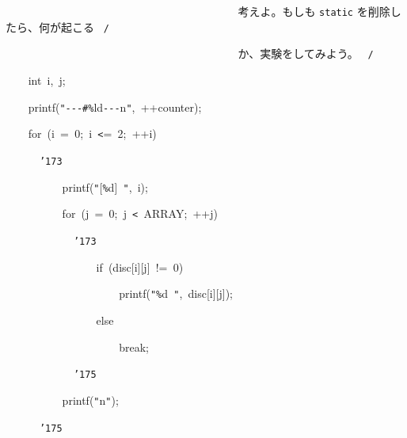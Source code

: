 \documentclass{article}
\begin{document}
\noindent
\mbox{}{\tt\mc \ \ \ \ \ \ \ \ }{\tt\mc \ \ \ \ \ \ \ \ }{\tt\mc \ \ \ \ \ \ \ \ }{\tt\mc \ \ \ \ \ \ \ \ }{\tt\mc \ \ \ \ \ \ \ \ }\rm\mc {\tt /}{\tt *}\  {}考えよ。もしも {\tt static}
					   を削除したら、何が起こる \hfill \rm\mc \ {\tt *}{\tt /}
\tt\mc 

\noindent
\mbox{}{\tt\mc \ \ \ \ \ \ \ \ }{\tt\mc \ \ \ \ \ \ \ \ }{\tt\mc \ \ \ \ \ \ \ \ }{\tt\mc \ \ \ \ \ \ \ \ }{\tt\mc \ \ \ \ \ \ \ \ }\rm\mc {\tt /}{\tt *}\  {}か、実験をしてみよう。
					   \hfill \rm\mc \ {\tt *}{\tt /}
\tt\mc 

\noindent
\mbox{}{\tt\mc \ \ \ \ }int{\tt\mc \ }i,{\tt\mc \ }j;

\noindent
\mbox{}\hfill

\noindent
\mbox{}{\tt\mc \ \ \ \ }printf({\tt "}{\tt -}{\tt -}{\tt -}{\tt\#}{\tt\%}ld{\tt -}{\tt -}{\tt -}{\tt{}}n{\tt "},{\tt\mc \ }++counter);

\noindent
\mbox{}{\tt\mc \ \ \ \ }for{\tt\mc \ }(i{\tt\mc \ }={\tt\mc \ }0;{\tt\mc \ }i{\tt\mc \ }{\tt <}={\tt\mc \ }2;{\tt\mc \ }++i)

\noindent
\mbox{}{\tt\mc \ \ \ \ \ \ }{\tt\char'173}

\noindent
\mbox{}{\tt\mc \ \ \ \ \ \ \ \ }{\tt\mc \ \ }printf({\tt "}[{\tt\%}d]{\tt\mc \ }{\tt "},{\tt\mc \ }i);

\noindent
\mbox{}{\tt\mc \ \ \ \ \ \ \ \ }{\tt\mc \ \ }for{\tt\mc \ }(j{\tt\mc \ }={\tt\mc \ }0;{\tt\mc \ }j{\tt\mc \ }{\tt <}{\tt\mc \ }ARRAY;{\tt\mc \ }++j)

\noindent
\mbox{}{\tt\mc \ \ \ \ \ \ \ \ }{\tt\mc \ \ \ \ }{\tt\char'173}

\noindent
\mbox{}{\tt\mc \ \ \ \ \ \ \ \ }{\tt\mc \ \ \ \ \ \ \ \ }if{\tt\mc \ }(disc[i][j]{\tt\mc \ }!={\tt\mc \ }0)

\noindent
\mbox{}{\tt\mc \ \ \ \ \ \ \ \ }{\tt\mc \ \ \ \ \ \ \ \ }{\tt\mc \ \ \ \ }printf({\tt "}{\tt\%}d{\tt\mc \ }{\tt "},{\tt\mc \ }disc[i][j]);

\noindent
\mbox{}{\tt\mc \ \ \ \ \ \ \ \ }{\tt\mc \ \ \ \ \ \ \ \ }else

\noindent
\mbox{}{\tt\mc \ \ \ \ \ \ \ \ }{\tt\mc \ \ \ \ \ \ \ \ }{\tt\mc \ \ \ \ }break;

\noindent
\mbox{}{\tt\mc \ \ \ \ \ \ \ \ }{\tt\mc \ \ \ \ }{\tt\char'175}

\noindent
\mbox{}{\tt\mc \ \ \ \ \ \ \ \ }{\tt\mc \ \ }printf({\tt "}{\tt{}}n{\tt "});

\noindent
\mbox{}{\tt\mc \ \ \ \ \ \ }{\tt\char'175}
\end{document}
